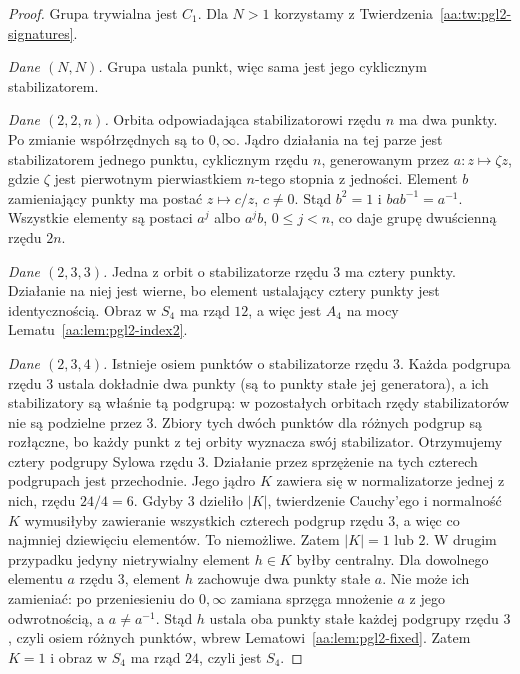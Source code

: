 \begin{proof}
Grupa trywialna jest $C_1$. Dla $N>1$ korzystamy
z Twierdzenia~\ref{aa:tw:pgl2-signatures}.

\emph{Dane $(N,N)$.} Grupa ustala punkt, więc sama
jest jego cyklicznym stabilizatorem.

\emph{Dane $(2,2,n)$.} Orbita odpowiadająca stabilizatorowi
rzędu $n$ ma dwa punkty. Po zmianie współrzędnych
są to $0,\infty$. Jądro działania na tej parze jest
stabilizatorem jednego punktu, cyklicznym rzędu $n$,
generowanym przez $a:z\mapsto\zeta z$, gdzie $\zeta$
jest pierwotnym pierwiastkiem $n$-tego stopnia z jedności.
Element $b$ zamieniający punkty ma postać $z\mapsto c/z$,
$c\ne0$. Stąd $b^2=1$ i $bab^{-1}=a^{-1}$.
Wszystkie elementy są postaci $a^j$ albo $a^jb$,
$0\le j<n$, co daje grupę dwuścienną rzędu $2n$.

\emph{Dane $(2,3,3)$.} Jedna z orbit o stabilizatorze
rzędu $3$ ma cztery punkty. Działanie na niej jest wierne,
bo element ustalający cztery punkty jest identycznością.
Obraz w $S_4$ ma rząd $12$, a więc jest $A_4$
na mocy Lematu~\ref{aa:lem:pgl2-index2}.

\emph{Dane $(2,3,4)$.} Istnieje osiem punktów
o stabilizatorze rzędu $3$. Każda podgrupa rzędu $3$
ustala dokładnie dwa punkty (są to punkty stałe jej generatora),
a ich stabilizatory są właśnie tą podgrupą: w pozostałych
orbitach rzędy stabilizatorów nie są podzielne przez $3$.
Zbiory tych dwóch punktów dla różnych podgrup są rozłączne,
bo każdy punkt z tej orbity wyznacza swój stabilizator.
Otrzymujemy cztery podgrupy Sylowa rzędu $3$.
Działanie przez sprzężenie na tych czterech podgrupach
jest przechodnie. Jego jądro $K$ zawiera się w normalizatorze
jednej z nich, rzędu $24/4=6$.
Gdyby $3$ dzieliło $|K|$, twierdzenie Cauchy'ego
i normalność $K$ wymusiłyby zawieranie wszystkich czterech
podgrup rzędu $3$, a więc co najmniej dziewięciu elementów.
To niemożliwe. Zatem $|K|=1$ lub $2$.
W drugim przypadku jedyny nietrywialny element $h\in K$
byłby centralny. Dla dowolnego elementu $a$ rzędu $3$,
element $h$ zachowuje dwa punkty stałe $a$.
Nie może ich zamieniać: po przeniesieniu do $0,\infty$
zamiana sprzęga mnożenie $a$ z jego odwrotnością,
a $a\ne a^{-1}$. Stąd $h$ ustala oba punkty stałe
każdej podgrupy rzędu $3$, czyli osiem różnych punktów,
wbrew Lematowi~\ref{aa:lem:pgl2-fixed}.
Zatem $K=1$ i obraz w $S_4$ ma rząd $24$, czyli jest $S_4$.


\end{proof}
